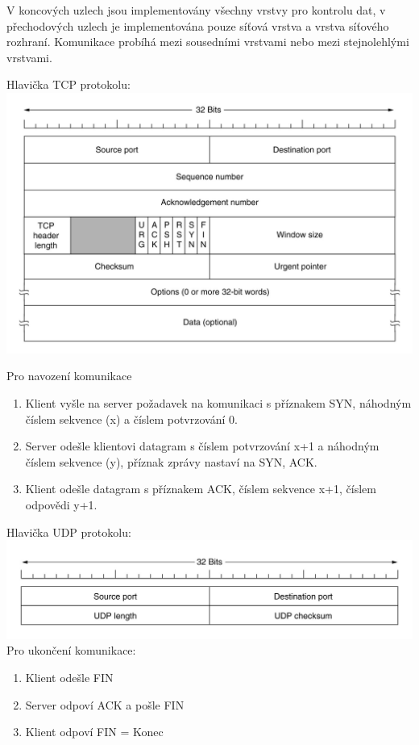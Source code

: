     V koncových uzlech jsou implementovány všechny vrstvy pro kontrolu dat, v přechodových uzlech je implementována pouze síťová vrstva a vrstva síťového rozhraní.
    Komunikace probíhá mezi sousedními vrstvami nebo mezi stejnolehlými vrstvami.
    \begin{multicols}{2}
      Hlavička TCP protokolu: \\
      \includegraphics[width=\linewidth]{TVY-POS/ISO-OSI-TCP-IP/TCPheader.jpg}
      \columnbreak
      
      Pro navození komunikace
      \begin{enumerate}
        \item Klient vyšle na server požadavek na komunikaci s příznakem SYN, náhodným číslem sekvence (x) a číslem potvrzování 0.
        \item Server odešle klientovi datagram s číslem potvrzování x+1 a náhodným číslem sekvence (y), příznak zprávy nastaví na SYN, ACK.
        \item Klient odešle datagram s příznakem ACK, číslem sekvence x+1, číslem odpovědi y+1.
      \end{enumerate}
    \end{multicols}
    \begin{multicols}{2}
        Hlavička UDP protokolu: \\
        \includegraphics[width=\linewidth]{TVY-POS/ISO-OSI-TCP-IP/UDPheader.jpg}
        \columnbreak
        \newline
        Pro ukončení komunikace:
        \begin{enumerate}
          \item Klient odešle FIN
          \item Server odpoví ACK a pošle FIN
          \item Klient odpoví FIN = Konec
        \end{enumerate}
      \end{multicols}

